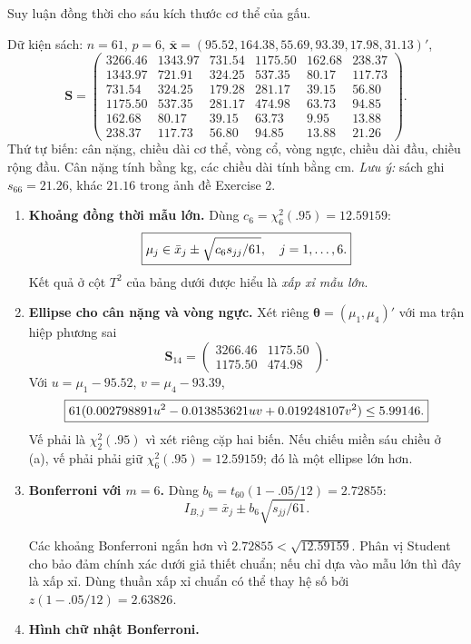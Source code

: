 \begin{problem}[Bài 5.9.]
Suy luận đồng thời cho sáu kích thước cơ thể của gấu.
\end{problem}
\begin{solution}
Dữ kiện sách: $n=61$, $p=6$, $\bar{\mathbf x}=(95.52,164.38,55.69,93.39,17.98,31.13)'$,
\[
\mathbf S=\begin{pmatrix}
3266.46&1343.97&731.54&1175.50&162.68&238.37\\
1343.97&721.91&324.25&537.35&80.17&117.73\\
731.54&324.25&179.28&281.17&39.15&56.80\\
1175.50&537.35&281.17&474.98&63.73&94.85\\
162.68&80.17&39.15&63.73&9.95&13.88\\
238.37&117.73&56.80&94.85&13.88&21.26
\end{pmatrix}.
\]
Thứ tự biến: cân nặng, chiều dài cơ thể, vòng cổ, vòng ngực, chiều dài đầu,
chiều rộng đầu. Cân nặng tính bằng kg, các chiều dài tính bằng cm.
\textit{Lưu ý:} sách ghi $s_{66}=21.26$, khác $21.16$ trong ảnh đề Exercise 2.
\begin{enumerate}[label=\textbf{\alph*)}]
\item \textbf{Khoảng đồng thời mẫu lớn.}
Dùng $c_6=\chi_6^2(.95)=12.59159$:
\[
\boxed{\mu_j\in\bar x_j\pm\sqrt{c_6s_{jj}/61},\quad j=1,\ldots,6.}
\]
Kết quả ở cột $T^2$ của bảng dưới được hiểu là \textit{xấp xỉ mẫu lớn}.
\item \textbf{Ellipse cho cân nặng và vòng ngực.}
Xét riêng $\boldsymbol\theta=(\mu_1,\mu_4)'$ với ma trận hiệp phương sai
\[
\mathbf S_{14}=\begin{pmatrix}3266.46&1175.50\\1175.50&474.98\end{pmatrix}.
\]
Với $u=\mu_1-95.52$, $v=\mu_4-93.39$,
\[
\boxed{61(0.002798891u^2-0.013853621uv+0.019248107v^2)\le5.99146.}
\]
Vế phải là $\chi_2^2(.95)$ vì xét riêng cặp hai biến. Nếu chiếu miền sáu chiều
ở (a), vế phải phải giữ $\chi_6^2(.95)=12.59159$; đó là một ellipse lớn hơn.
\item \textbf{Bonferroni với $m=6$.}
Dùng $b_6=t_{60}(1-.05/12)=2.72855$:
\[
I_{B,j}=\bar x_j\pm b_6\sqrt{s_{jj}/61}.
\]

Các khoảng Bonferroni ngắn hơn vì $2.72855<\sqrt{12.59159}$.
Phân vị Student cho bảo đảm chính xác dưới giả thiết chuẩn; nếu chỉ dựa
vào mẫu lớn thì đây là xấp xỉ. Dùng thuần xấp xỉ chuẩn có thể thay hệ số
bởi $z(1-.05/12)=2.63826$.
\item \textbf{Hình chữ nhật Bonferroni.}

\end{enumerate}
\end{solution}
